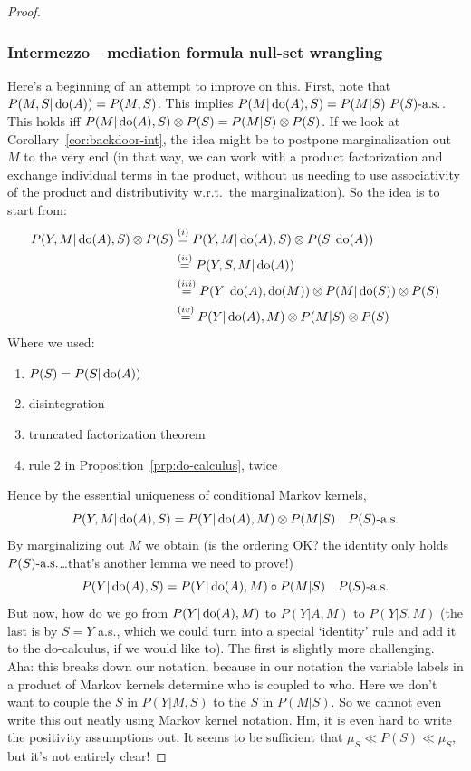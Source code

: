 \begin{proof}
\subsubsection{Intermezzo---mediation formula null-set wrangling}
Here's a beginning of an attempt to improve on this.
First, note that $P(M,S|\operatorname{do}(A)) = P(M,S)$.
This implies $P(M|\doit(A),S) = P(M|S)\ P(S)\as$.
This holds iff $P(M|\operatorname{do}(A),S) \otimes P(S) = P(M|S) \otimes P(S)$.
If we look at Corollary~\ref{cor:backdoor-int}, the idea might be to postpone marginalization out $M$ to the very end (in that way, we can work with a product factorization and exchange individual terms in the product, without us needing to use associativity of the product and distributivity w.r.t.\ the marginalization).
So the idea is to start from:
  \begin{equation*}\begin{split}
    P(Y,M | \operatorname{do}(A),S) \otimes P(S) 
    &\overset{(i)}{=} P(Y,M | \operatorname{do}(A),S) \otimes P(S|\operatorname{do}(A)) \\
    &\overset{(ii)}{=} P(Y,S,M | \operatorname{do}(A)) \\
    &\overset{(iii)}{=} P(Y | \operatorname{do}(A),\operatorname{do}(M)) \otimes P(M | \operatorname{do}(S)) \otimes P(S) \\
    &\overset{(iv)}{=} P(Y | \operatorname{do}(A), M) \otimes P(M | S) \otimes P(S)
  \end{split}\end{equation*}
Where we used:
\begin{enumerate}[label=(\roman*)]
  \item $P(S) = P(S | \operatorname{do}(A))$
  \item disintegration
  \item truncated factorization theorem
  \item rule 2 in Proposition~\ref{prp:do-calculus}, twice
\end{enumerate}
Hence by the essential uniqueness of conditional Markov kernels,
$$P(Y,M | \operatorname{do}(A),S) = P(Y | \operatorname{do}(A), M) \otimes P(M | S) \quad P(S)\text{-a.s.}$$
By marginalizing out $M$ we obtain (is the ordering OK? the identity only holds $P(S)\text{-a.s.}$\dots that's another lemma we need to prove!)
$$P(Y | \operatorname{do}(A),S) = P(Y | \operatorname{do}(A), M) \circ P(M | S) \quad P(S)\text{-a.s.}$$
But now, how do we go from $P(Y | \operatorname{do}(A), M)$ to $P(Y | A, M)$ to $P(Y | S,M)$ (the last is by $S=Y$ a.s., which we could turn into a special `identity' rule and add it to the do-calculus, if we would like to).
The first is slightly more challenging.
Aha: this breaks down our notation, because in our notation the variable labels in a product of Markov kernels determine who is coupled to who.
Here we don't want to couple the $S$ in $P(Y|M,S)$ to the $S$ in $P(M|S)$.
So we cannot even write this out neatly using Markov kernel notation.
Hm, it is even hard to write the positivity assumptions out.
It seems to be sufficient that $\mu_S \ll P(S) \ll \mu_S$, but it's not entirely clear!


\end{proof}
